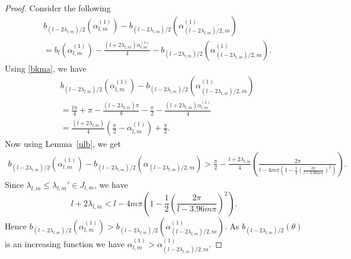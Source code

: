\documentclass[12pt,reqno]{amsart}
\newcommand{\lemref}[1]{Lemma~\ref{#1}}
\begin{document}
\begin{proof} Consider the following
\begin{align*}
&b_{(l-2\lambda_{l,m})/2}(\alpha_{l,m}^{(1)})-b_{(l-2\lambda_{l,m})/2}(\alpha_{(l-2\lambda_{l,m})/2,m}^{(1)})\\
&=b_{l}(\alpha_{l,m}^{(1)})-\frac{(l+2\lambda_{l,m})\alpha_{l,m}^{(1)}}{4}
-b_{(l-2\lambda_{l,m})/2}(\alpha_{(l-2\lambda_{l,m})/2,m}^{(1)}).
\end{align*}
Using \eqref{bkma}, we have
\begin{align*}
&b_{(l-2\lambda_{l,m})/2}(\alpha_{l,m}^{(1)})-b_{(l-2\lambda_{l,m})/2}(\alpha_{(l-2\lambda_{l,m})/2,m}^{(1)})\\&=\frac{l\pi}{4}+\pi-\frac{(l-2\lambda_{l,m})\pi}{8}-\frac{\pi}{2}-\frac{(l+2\lambda_{l,m})\alpha_{l,m}^{(1)}}{4}\\
&=\frac{(l+2\lambda_{l,m})}{4}\left(\frac{\pi}{2}-\alpha_{l,m}^{(1)}\right)+\frac{\pi}{2}.
\end{align*}
Now using \lemref{ulb}, we get
\begin{align}\label{k>l/2}
b_{(l-2\lambda_{l,m})/2}(\alpha_{l,m}^{(1)})-b_{(l-2\lambda_{l,m})/2}(\alpha_{(l-2\lambda_{l,m})/2,m})
>\frac{\pi}{2}-\frac{l+2\lambda_{l,m}}{4}\left(\frac{2\pi}{l-4m\pi\left(1-\frac{1}{2}\left(\frac{2\pi}{l-3.96m\pi}\right)^2\right)}\right).
\end{align}
Since $\lambda_{l,m}\le \lambda_{l,m}' \in J_{l,m}$, we have
$$
l+2\lambda_{l,m}<l-4m\pi\left(1-\frac{1}{2}\left(\frac{2\pi}{l-3.96m\pi}\right)^2\right).
$$
Hence $b_{(l-2\lambda_{l,m})/2}(\alpha_{l,m}^{(1)})>b_{(l-2\lambda_{l,m})/2}(\alpha_{(l-2\lambda_{l,m})/2,m}^{(1)})
$. As $b_{(l-2\lambda_{l,m})/2}(\theta)$ is an increasing function we have $\alpha_{l,m}^{(1)}>\alpha_{(l-2\lambda_{l,m})/2,m}^{(1)}$.

\end{proof}
\end{document}
